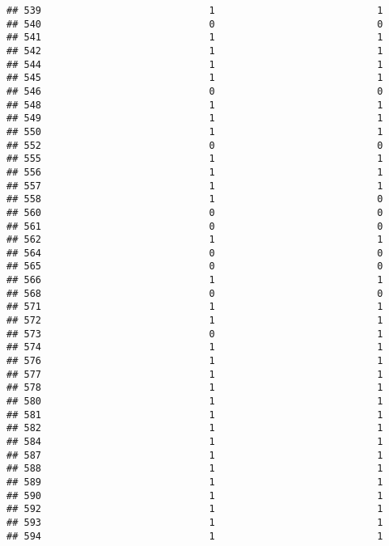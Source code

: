\documentclass[
]{article}
\begin{document}
\begin{verbatim}
## 539                             1                            1
## 540                             0                            0
## 541                             1                            1
## 542                             1                            1
## 544                             1                            1
## 545                             1                            1
## 546                             0                            0
## 548                             1                            1
## 549                             1                            1
## 550                             1                            1
## 552                             0                            0
## 555                             1                            1
## 556                             1                            1
## 557                             1                            1
## 558                             1                            0
## 560                             0                            0
## 561                             0                            0
## 562                             1                            1
## 564                             0                            0
## 565                             0                            0
## 566                             1                            1
## 568                             0                            0
## 571                             1                            1
## 572                             1                            1
## 573                             0                            1
## 574                             1                            1
## 576                             1                            1
## 577                             1                            1
## 578                             1                            1
## 580                             1                            1
## 581                             1                            1
## 582                             1                            1
## 584                             1                            1
## 587                             1                            1
## 588                             1                            1
## 589                             1                            1
## 590                             1                            1
## 592                             1                            1
## 593                             1                            1
## 594                             1                            1

\end{verbatim}
\end{document}
